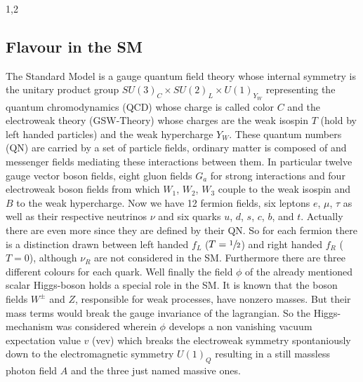 \documentclass[11pt,a4paper,twoside]{article}
\begin{document}
\begin{spacing}{1,2}
\subsection{Flavour in the SM}
The Standard Model is a gauge quantum field theory whose internal symmetry is the unitary product group $SU(3)_C\times SU(2)_L\times U(1)_{Y_W}$ representing
the quantum chromodynamics (QCD) whose charge is called color $C$ and the electroweak theory (GSW-Theory) whose charges are the weak isospin $T$ 
(hold by left handed particles) and the weak hypercharge $Y_W$. These quantum numbers (QN) are carried by a set of particle fields, ordinary matter is composed
of and messenger fields mediating these interactions between them. In particular twelve gauge vector boson fields, eight gluon fields $G_a$ for strong 
interactions and four electroweak boson fields from which $W_1$, $W_2$, $W_3$ couple to the weak isospin and $B$ to the weak hypercharge. Now we have 12
fermion fields, six leptons $e$, $\mu$, $\tau$ as well as their respective neutrinos $\nu$ and six quarks $u$, $d$, $s$, $c$, $b$, and $t$. Actually there
are even more since they are defined by their QN. So for each fermion there is a distinction drawn between left handed $f_L$ ($T=\sfrac12$) and right 
handed $f_R$ ($T=0$), although $\nu_R$ are not considered in the SM. Furthermore there are three different colours for each quark. Well finally the field 
$\phi$ of the already mentioned scalar
Higgs-boson holds a special role in the SM. It is known that the boson fields $W^\pm$ and $Z$, responsible for weak processes, have nonzero masses. But their
mass terms would break the gauge invariance of the lagrangian. So the Higgs-mechanism was considered wherein $\phi$ develops a non vanishing vacuum expectation
value $v$ (vev) which breaks the electroweak symmetry spontaniously down to the electromagnetic symmetry $U(1)_Q$ resulting in a still massless photon field 
$A$ and the three just named massive ones.

\end{spacing}
\end{document}
